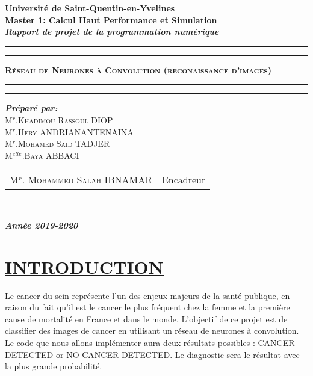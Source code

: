 \documentclass[11pt]{article}
\begin{document}
\begin{center}
{\Large {\bf Université de Saint-Quentin-en-Yvelines}}\\
{\Large {\bf {Master 1: Calcul Haut Performance et Simulation }}}\\
 \textbf{{\Huge  \textit{Rapport de projet de la programmation numérique}}} \\
\hrule
\hrule
{}
{\Huge \textbf{\textsc{ Réseau de Neurones à Convolution (reconaissance d’images) }}}\\
\hrule
\hrule
{}
{\textbf{\textit {Préparé par:}}}\\
{\large\textsc{M$^{r}$.Khadimou Rassoul DIOP}}\\
{\large\textsc{M$^{r}$.Hery ANDRIANANTENAINA}}\\
{\large\textsc{M$^{r}$.Mohamed Said TADJER }}\\
{\large\textsc{M$^{elle}$.Baya ABBACI}}\\
{\large
\begin{tabular}{ll}
M$^{r}$. \textsc{Mohammed Salah} IBNAMAR  & Encadreur    \\
\end{tabular}
}\\

{\Large\textbf{\textit{ Année 2019-2020}}}
\end{center}
\newpage

\tableofcontents

\clearpage
\section{\underline{INTRODUCTION}}

Le cancer du sein représente l'un des enjeux majeurs de la santé publique, en raison du fait qu'il est le cancer le plus fréquent chez la femme et la première cause de mortalité en France et dans le monde. L'objectif de ce projet est de classifier des images de cancer en utilisant un réseau de neurones à convolution. Le code que nous allons implémenter aura deux résultats possibles : CANCER DETECTED or NO CANCER DETECTED. Le diagnostic sera le résultat avec la plus grande probabilité.
\end{document}
